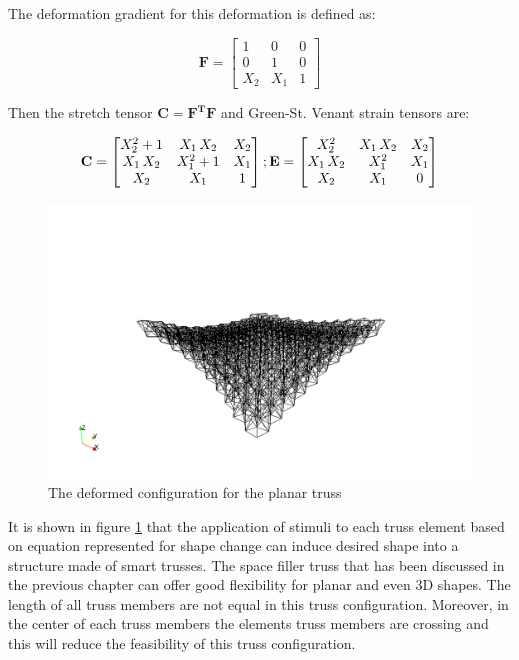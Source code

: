 The deformation gradient for this deformation is defined as:

\begin{equation}
\mathbf F=
\begin{bmatrix}
1&0&0 \\
0&1&0 \\
X_2 & X_1 & 1
\end{bmatrix}
\label{deformation_gradient_doubly_curved_mapping:eqn}
\end{equation}

Then the stretch tensor $\mathbf C=\mathbf {F^T F}$ and Green-St. Venant strain tensors are:

\begin{equation}
\mathbf C=
\begin{bmatrix}
X_{2}^2+1&X_{1}\,
X_{2}&X_{2}\cr X_{1}\,X_{2}&X_{1}^2+1&X_{
 1}\cr X_{2}&X_{1}&1\cr 
\end{bmatrix}
; \mathbf E=
\begin{bmatrix}
X_{2}^2&X_{1}\,X_{2}&X_{2}\cr X_{1}\,X_{2}&X_{1}^2&X_{1}\cr X_{2}&X_{1}&0\cr 
 \end{bmatrix}
\label{green_deformation_tensor_doubly_curved_mapping:eqn}
\end{equation} 
  
\begin{figure} 
\centering
\includegraphics[width=5.0in]{./chap_5_active_trusses/images_space_filler/planar_truss_deformed_config.png}
\caption{The deformed configuration for the planar truss}
\label{fig:planar_truss_deformed_config}
\end{figure}

It is shown in figure \ref{fig:planar_truss_deformed_config} that the application of stimuli to each truss element based on equation represented for shape change can induce 
 desired shape into a structure made of smart trusses.  
The space filler truss that has been discussed in the previous chapter can offer good flexibility for planar and even 3D shapes. 
The length of all truss members are not equal in this truss configuration.
Moreover, in the center of each truss members the elements truss members are crossing and this will reduce the feasibility of this truss configuration.

